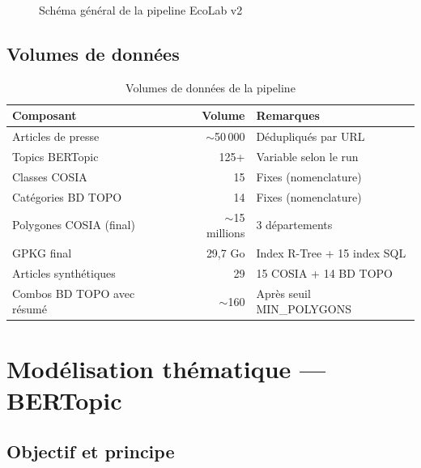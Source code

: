 \documentclass[12pt,a4paper]{report}
\newcommand{\bdtopo}{\textsc{BD TOPO}}
\begin{document}
\begin{figure}[H]
\caption{Schéma général de la pipeline EcoLab v2}
\end{figure}

\subsection{Volumes de données}

\begin{table}[H]
\centering
\begin{tabular}{lrl}
\toprule
\textbf{Composant} & \textbf{Volume} & \textbf{Remarques} \\
\midrule
Articles de presse & $\sim$50\,000 & Dédupliqués par URL \\
Topics BERTopic & 125+ & Variable selon le run \\
Classes COSIA & 15 & Fixes (nomenclature) \\
Catégories \bdtopo{} & 14 & Fixes (nomenclature) \\
Polygones COSIA (final) & $\sim$15 millions & 3 départements \\
GPKG final & 29,7 Go & Index R-Tree + 15 index SQL \\
Articles synthétiques & 29 & 15 COSIA + 14 \bdtopo{} \\
Combos \bdtopo{} avec résumé & $\sim$160 & Après seuil MIN\_POLYGONS \\
\bottomrule
\end{tabular}
\caption{Volumes de données de la pipeline}
\end{table}

\section{Modélisation thématique — BERTopic}

\subsection{Objectif et principe}
\end{document}
